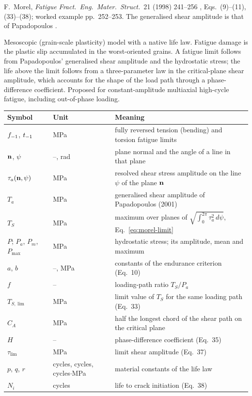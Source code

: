\label{sheet:MOREL}

 F.~Morel, \emph{Fatigue Fract.\ Eng.\ Mater.\ Struct.}\ 21 (1998) 241--256
\cite{morel1998}, Eqs.~(9)--(11), (33)--(38); worked example pp.~252--253. The generalised shear
amplitude is that of Papadopoulos \cite{papadopoulos2001}.

 Mesoscopic (grain-scale plasticity) model with a native life law. Fatigue damage
is the plastic slip accumulated in the worst-oriented grains. A fatigue limit follows from
Papadopoulos' generalised shear amplitude and the hydrostatic stress; the life above the limit follows
from a three-parameter law in the critical-plane shear amplitude, which accounts for the shape of the
load path through a phase-difference coefficient. Proposed for constant-amplitude multiaxial
high-cycle fatigue, including out-of-phase loading.

\begin{center}\small
\begin{tabular}{@{}llp{100mm}@{}}
\toprule
Symbol & Unit & Meaning\\\midrule
$f_{-1}$, $t_{-1}$ & MPa & fully reversed tension (bending) and torsion fatigue limits\\
$\mathbf n$, $\psi$ & --, rad & plane normal and the angle of a line in that plane\\
$\tau_a(\mathbf n,\psi)$ & MPa & resolved shear stress amplitude on the line $\psi$ of the plane $\mathbf n$\\
$T_a$ & MPa & generalised shear amplitude of Papadopoulos (2001)\\
$T_S$ & MPa & maximum over planes of $\sqrt{\int_0^{2\pi}\tau_a^2\,d\psi}$, Eq.~\eqref{eq:morel-limit}\\
$P$; $P_a$, $P_m$, $P_{\max}$ & MPa & hydrostatic stress; its amplitude, mean and maximum\\
$a$, $b$ & --, MPa & constants of the endurance criterion (Eq.~10)\\
$f$ & -- & loading-path ratio $T_S/P_a$\\
$T_{S,\lim}$ & MPa & limit value of $T_S$ for the same loading path (Eq.~33)\\
$C_A$ & MPa & half the longest chord of the shear path on the critical plane\\
$H$ & -- & phase-difference coefficient (Eq.~35)\\
$\tau_{\lim}$ & MPa & limit shear amplitude (Eq.~37)\\
$p$, $q$, $r$ & cycles, cycles, cycles$\cdot$MPa & material constants of the life law\\
$N_i$ & cycles & life to crack initiation (Eq.~38)\\
\bottomrule
\end{tabular}
\end{center}

